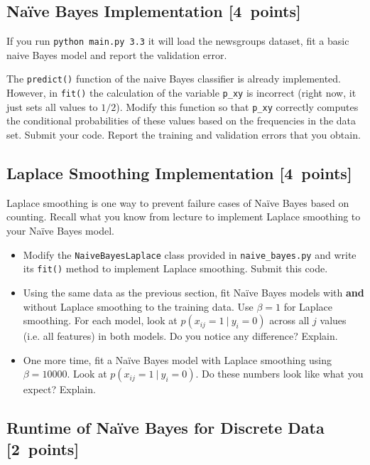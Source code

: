 \documentclass{article}
\newcommand{\blu}[1]{{\textcolor{blu}{#1}}}
\let\ask\blu
\newcommand\pts[1]{\textcolor{pointscolour}{[#1~points]}}
\begin{document}
    \clearpage
    \subsection{Na\"ive Bayes Implementation \pts{4}}

    If you run \texttt{python main.py 3.3}
    it will load the newsgroups dataset, fit a basic naive Bayes model and report the validation error.

    The \texttt{predict()} function of the naive Bayes classifier is already implemented.
    However, in \texttt{fit()}
    the calculation of the variable \texttt{p\_xy} is incorrect
    (right now, it just sets all values to $1/2$).
    \ask{Modify this function so that \texttt{p\_xy} correctly
        computes the conditional probabilities of these values based on the
        frequencies in the data set. Submit your code. Report the training and validation errors that you obtain.}
    

    \clearpage
    \subsection{Laplace Smoothing Implementation \pts{4}}

    Laplace smoothing is one way to prevent failure cases of Na\"ive Bayes based on counting. Recall what you know from lecture to implement Laplace smoothing to your Na\"ive Bayes model.
    \begin{itemize}
        \item Modify the \texttt{NaiveBayesLaplace} class provided in \texttt{naive\_bayes.py} and write its \texttt{fit()} method to implement Laplace smoothing. \ask{Submit this code.}
        
        \item Using the same data as the previous section, fit Na\"ive Bayes models with \textbf{and} without Laplace smoothing to the training data. Use $\beta=1$ for Laplace smoothing. For each model, look at $p(x_{ij} = 1 \ | \ y_i = 0)$ across all $j$ values (i.e. all features) in both models. \ask{Do you notice any difference? Explain.}
        \item One more time, fit a Na\"ive Bayes model with Laplace smoothing using $\beta=10000$. Look at $p(x_{ij} = 1 \ | \ y_i = 0)$. \ask{Do these numbers look like what you expect? Explain.}
    \end{itemize}

    \clearpage
    \subsection{Runtime of Na\"ive Bayes for Discrete Data \pts{2}}
\end{document}
